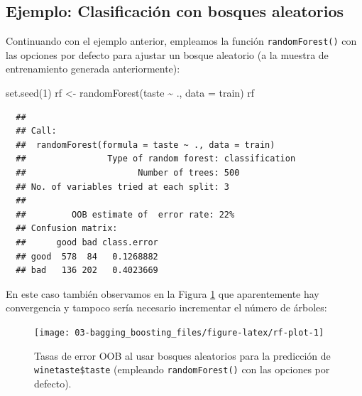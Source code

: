 \documentclass[
]{book}
\newenvironment{Shaded}{\begin{snugshade}}{\end{snugshade}}
\newcommand{\AttributeTok}[1]{\textcolor[rgb]{0.77,0.63,0.00}{#1}}
\newcommand{\DecValTok}[1]{\textcolor[rgb]{0.00,0.00,0.81}{#1}}
\newcommand{\FunctionTok}[1]{\textcolor[rgb]{0.00,0.00,0.00}{#1}}
\newcommand{\NormalTok}[1]{#1}
\newcommand{\OtherTok}[1]{\textcolor[rgb]{0.56,0.35,0.01}{#1}}
\newcommand{\SpecialCharTok}[1]{\textcolor[rgb]{0.00,0.00,0.00}{#1}}
\newcommand{\StringTok}[1]{\textcolor[rgb]{0.31,0.60,0.02}{#1}}
\theoremstyle{break}
\theoremstyle{nonumberplain}
\begin{document}
\hypertarget{ejemplo-clasif-rf}{%
\subsection{Ejemplo: Clasificación con bosques aleatorios}\label{ejemplo-clasif-rf}}

Continuando con el ejemplo anterior, empleamos la función \texttt{randomForest()} con las opciones por defecto para ajustar un bosque aleatorio (a la muestra de entrenamiento generada anteriormente):

\begin{Shaded}
\begin{Highlighting}[]
\FunctionTok{set.seed}\NormalTok{(}\DecValTok{1}\NormalTok{)}
\NormalTok{rf }\OtherTok{\textless{}{-}} \FunctionTok{randomForest}\NormalTok{(taste }\SpecialCharTok{\textasciitilde{}}\NormalTok{ ., }\AttributeTok{data =}\NormalTok{ train)}
\NormalTok{rf}
\end{Highlighting}
\end{Shaded}

\begin{verbatim}
  ## 
  ## Call:
  ##  randomForest(formula = taste ~ ., data = train) 
  ##                Type of random forest: classification
  ##                      Number of trees: 500
  ## No. of variables tried at each split: 3
  ## 
  ##         OOB estimate of  error rate: 22%
  ## Confusion matrix:
  ##      good bad class.error
  ## good  578  84   0.1268882
  ## bad   136 202   0.4023669
\end{verbatim}

En este caso también observamos en la Figura \ref{fig:rf-plot} que aparentemente hay convergencia y tampoco sería necesario incrementar el número de árboles:



\begin{Shaded}
\end{Shaded}

\begin{figure}[!htb]

{\centering \texttt{[image: 03-bagging\_boosting\_files/figure-latex/rf-plot-1]} 

}

\caption{Tasas de error OOB al usar bosques aleatorios para la predicción de \texttt{winetaste\$taste} (empleando \texttt{randomForest()} con las opciones por defecto).}\label{fig:rf-plot}
\end{figure}
\end{document}

